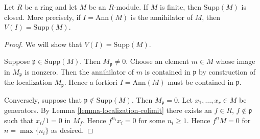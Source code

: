 \begin{lemma}
\label{lemma-support-closed}
Let $R$ be a ring and let $M$ be an $R$-module.
If $M$ is finite, then $\text{Supp}(M)$ is closed.
More precisely, if $I = \text{Ann}(M)$ is the annihilator of $M$, then
$V(I) = \text{Supp}(M)$.
\end{lemma}

\begin{proof}
We will show that $V(I) = \text{Supp}(M)$.

\medskip\noindent
Suppose $\mathfrak p \in \text{Supp}(M)$. Then $M_{\mathfrak p} \not = 0$.
Choose an element $m \in M$ whose image in $M_\mathfrak p$ is nonzero.
Then the annihilator of $m$ is contained in $\mathfrak p$ by construction
of the localization $M_\mathfrak p$. Hence
a fortiori $I = \text{Ann}(M)$ must be contained in $\mathfrak p$.

\medskip\noindent
Conversely, suppose that $\mathfrak p \not \in \text{Supp}(M)$.
Then $M_{\mathfrak p} = 0$.
Let $x_1, \ldots, x_r \in M$ be generators.
By Lemma \ref{lemma-localization-colimit} there exists
an $f \in R$, $f\not\in \mathfrak p$ such that
$x_i/1 = 0$ in $M_f$. Hence $f^{n_i} x_i = 0$ for some $n_i \geq 1$.
Hence $f^nM = 0$ for $n = \max\{n_i\}$ as desired.
\end{proof}
